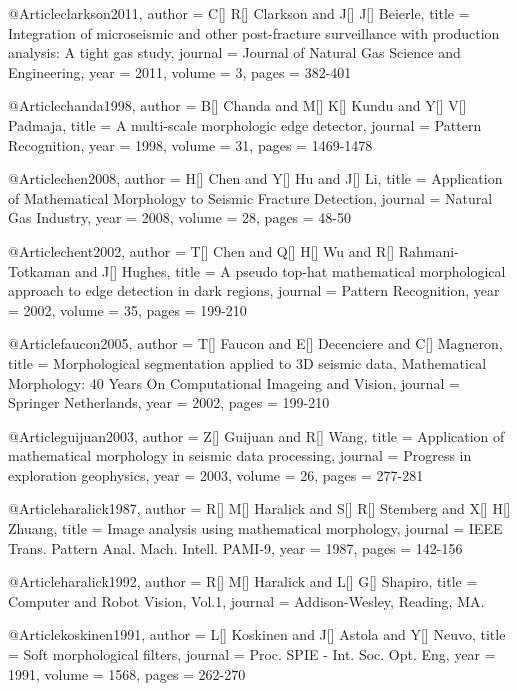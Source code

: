     @Article{clarkson2011,
  author = 	 {C[] R[] Clarkson and J[] J[] Beierle},
  title = 	 {Integration of microseismic and other post-fracture surveillance
with production analysis: A tight gas study},
  journal = 	 {Journal of Natural Gas Science and Engineering},
  year = 	 2011,
  volume = 	 3,
  pages = 	 {382-401}} 
  
    @Article{chanda1998,
  author = 	 {B[] Chanda and M[] K[] Kundu and Y[] V[] Padmaja},
  title = 	 {A multi-scale morphologic edge detector},
  journal = 	 {Pattern Recognition},
  year = 	 1998,
  volume = 	 31,
  pages = 	 {1469-1478}} 
  
    @Article{chen2008,
  author = 	 {H[] Chen and Y[] Hu and J[] Li},
  title = 	 {Application of Mathematical Morphology to Seismic Fracture Detection},
  journal = 	 {Natural Gas Industry},
  year = 	 2008,
  volume = 	 28,
  pages = 	 {48-50}}   
  
    @Article{chent2002,
  author = 	 {T[] Chen and Q[] H[] Wu and R[] Rahmani-Totkaman and J[] Hughes},
  title = 	 {A pseudo top-hat mathematical
morphological approach to edge detection in dark regions},
  journal = 	 {Pattern Recognition},
  year = 	 2002,
  volume = 	 35,
  pages = 	 {199-210}}   
  
@Article{faucon2005,
  author = 	 {T[] Faucon and E[] Decenciere and C[] Magneron},
  title = 	 {Morphological segmentation applied to 3{D} seismic data, Mathematical Morphology: 40 Years On Computational Imageing and Vision},
  journal = 	 {Springer Netherlands},
  year = 	 2002,
  pages = 	 {199-210}}      
  
    @Article{guijuan2003,
  author = 	 {Z[] Guijuan and R[] Wang},
  title = 	 {Application of mathematical morphology in seismic data processing},
  journal = 	 {Progress in exploration geophysics},
  year = 	 2003,
  volume = 	 26,
  pages = 	 {277-281}}     
   
@Article{haralick1987,
  author = 	 {R[] M[] Haralick and S[] R[] Stemberg and X[] H[] Zhuang},
  title = 	 {Image analysis using mathematical morphology},
  journal = 	 {IEEE Trans. Pattern Anal. Mach. Intell. PAMI-9},
  year = 	 1987,
  pages = 	 {142-156}}    
  
@Article{haralick1992,
  author = 	 {R[] M[] Haralick and L[] G[] Shapiro},
  title = 	 {Computer and Robot Vision, Vol.1},
  journal = 	 {Addison-Wesley, Reading,
MA.}}   
  
   @Article{koskinen1991,
  author = 	 {L[] Koskinen and J[] Astola and Y[] Neuvo},
  title = 	 {Soft morphological filters},
  journal = 	 {Proc. SPIE - Int. Soc. Opt. Eng},
  year = 	 1991,
    volume = 	 1568,
  pages = 	 {262-270}}     
  
